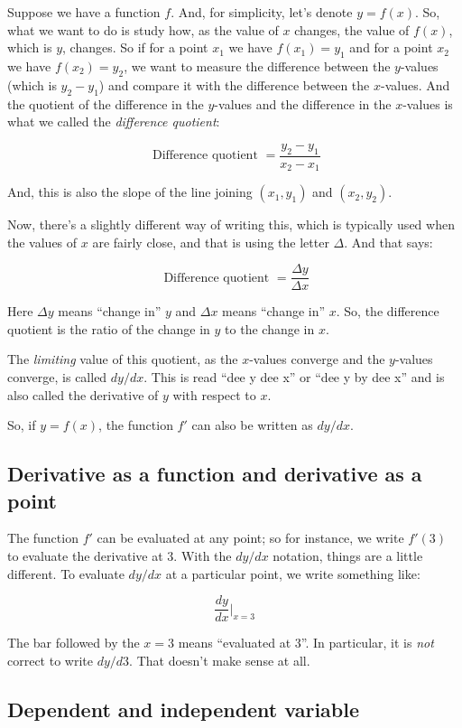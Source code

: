\documentclass[10pt]{amsart}
\begin{document}
Suppose we have a function $f$. And, for simplicity, let's denote $y =
f(x)$. So, what we want to do is study how, as the value of $x$
changes, the value of $f(x)$, which is $y$, changes. So if for a point
$x_1$ we have $f(x_1) = y_1$ and for a point $x_2$ we have $f(x_2) =
y_2$, we want to measure the difference between the $y$-values (which
is $y_2 - y_1$) and compare it with the difference between the
$x$-values. And the quotient of the difference in the $y$-values and the
difference in the $x$-values is what we called the {\em difference
quotient}:

$$\text{ Difference quotient } = \frac{y_2 - y_1}{x_2 - x_1}$$

And, this is also the slope of the line joining $(x_1,y_1)$ and
$(x_2,y_2)$.

Now, there's a slightly different way of writing this, which is
typically used when the values of $x$ are fairly close, and that is
using the letter $\Delta$. And that says:

$$\text{ Difference quotient } = \frac{\Delta y}{\Delta x}$$

Here $\Delta y$ means ``change in'' $y$ and $\Delta x$ means ``change
in'' $x$. So, the difference quotient is the ratio of the change in
$y$ to the change in $x$.

The {\em limiting} value of this quotient, as the $x$-values converge
and the $y$-values converge, is called $dy/dx$. This is read ``dee y
dee x'' or ``dee y by dee x'' and is also called the derivative of $y$
with respect to $x$.

So, if $y = f(x)$, the function $f'$ can also be written as $dy/dx$.

\subsection{Derivative as a function and derivative as a point}

The function $f'$ can be evaluated at any point; so for instance, we
write $f'(3)$ to evaluate the derivative at $3$. With the $dy/dx$
notation, things are a little different. To evaluate $dy/dx$ at a
particular point, we write something like:

$$\frac{dy}{dx}|_{x = 3}$$

The bar followed by the $x = 3$ means ``evaluated at $3$''. In
particular, it is {\em not} correct to write $dy/d3$. That doesn't
make sense at all.

\subsection{Dependent and independent variable}
\end{document}

